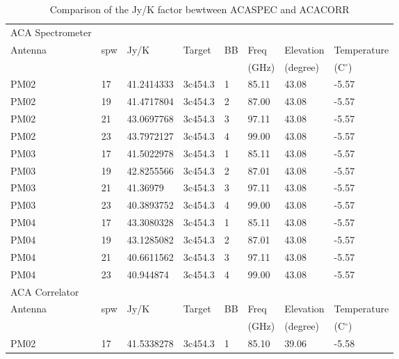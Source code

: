 \begin{table}[]
\centering
\caption{Comparison of the Jy/K factor bewtween ACASPEC and ACACORR}\label{tab:JyK}
\begin{tabular}{llllllll}
\hline \hline
ACA Spectrometer &     &            &         &    &            &               &         \\ 
Antenna          & spw & Jy/K       & Target  & BB & Freq       & Elevation & Temperature \\
                 &     &            &         &    & (GHz)       & (degree)  & (C$^\circ$) \\ \hline
PM02             & 17  & 41.2414333 & 3c454.3 & 1  & 85.11  & 43.08   & -5.57       \\
PM02             & 19  & 41.4717804 & 3c454.3 & 2  & 87.00 & 43.08   & -5.57       \\
PM02             & 21  & 43.0697768 & 3c454.3 & 3  & 97.11  & 43.08   & -5.57       \\
PM02             & 23  & 43.7972127 & 3c454.3 & 4  & 99.00 & 43.08   & -5.57       \\
PM03             & 17  & 41.5022978 & 3c454.3 & 1  & 85.11  & 43.08   & -5.57       \\
PM03             & 19  & 42.8255566 & 3c454.3 & 2  & 87.01 & 43.08   & -5.57       \\
PM03             & 21  & 41.36979   & 3c454.3 & 3  & 97.11  & 43.08   & -5.57       \\
PM03             & 23  & 40.3893752 & 3c454.3 & 4  & 99.00 & 43.08   & -5.57       \\
PM04             & 17  & 43.3080328 & 3c454.3 & 1  & 85.11  & 43.08   & -5.57       \\
PM04             & 19  & 43.1285082 & 3c454.3 & 2  & 87.01 & 43.08   & -5.57       \\
PM04             & 21  & 40.6611562 & 3c454.3 & 3  & 97.11  & 43.08   & -5.57       \\
PM04             & 23  & 40.944874  & 3c454.3 & 4  & 99.00 & 43.08   & -5.57       \\ \hline \hline
ACA Correlator   &     &            &         &    &            &               &       \\ 
Antenna          & spw & Jy/K       & Target  & BB & Freq       & Elevation & Temperature \\
                 &     &            &         &    & (GHz)       & (degree)  & (C$^\circ$) \\ \hline
PM02             & 17  & 41.5338278 & 3c454.3 & 1  & 85.10 & 39.06   & -5.58       \\

\end{tabular}
\end{table}
